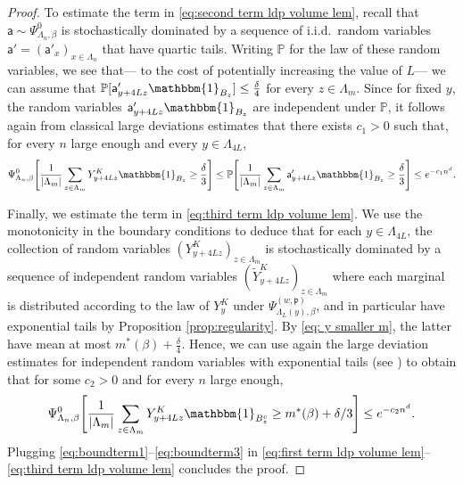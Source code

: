 \documentclass[11pt,a4paper]{article}
\theoremstyle{definition}
\numberwithin{equation}{section}
\begin{document}
\begin{proof}
To estimate the term in \eqref{eq:second term ldp volume lem},
recall that $\mathsf{a}\sim \Psi^0_{\Lambda_n,\beta}$ is stochastically dominated by a sequence of i.i.d.\ random variables $\mathsf{a}'=(\mathsf{a}'_x)_{x\in \Lambda_n}$ that have quartic tails. Writing $\mathbb{P}$ for the law of these random variables, we see that--- to the cost of potentially increasing the value of $L$--- we can assume that
$\mathbb{P}[\mathsf{a}'_{y+4Lz}\mathbbm{1}_{B_{z}}]\leq \tfrac{\delta}{4}$ for every $z\in \Lambda_m$. Since for fixed $y$, the random variables $\mathsf{a}'_{y+4Lz} \mathbbm{1}_{B_{z}}$ are independent under $\mathbb{P}$, it follows again from classical large deviations estimates that there exists $c_1>0$ such that, for every $n$ large enough and every $y\in \Lambda_{4L}$,
\begin{equation}\label{eq:boundterm2}
\Psi^0_{\Lambda_n,\beta}\Bigg[ \frac{1}{|\Lambda_m|} \sum_{
z\in \Lambda_m}Y_{y+4Lz}^K \mathbbm{1}_{B_z}\geq \frac{\delta}{3}\Bigg]\leq \mathbb{P}\Bigg[\frac{1}{|\Lambda_m|}\sum_{z\in \Lambda_m} \mathsf{a}'_{y+4Lz}\mathbbm{1}_{B_z}\geq \frac{\delta}{3}\Bigg]\leq e^{-c_1n^d}.
\end{equation}

Finally, we estimate the term in \eqref{eq:third term ldp volume lem}. We use the monotonicity in the boundary conditions to deduce that for each $y\in \Lambda_{4L}$,  the collection of random variables $(Y_{y+4Lz}^K)_{z\in \Lambda_m}$ is stochastically dominated by a sequence of independent random variables $(\tilde{Y}^K_{y+4Lz})_{z\in \Lambda_m}$ where each marginal is distributed according to the law of $Y_{y}^K$ under $\Psi^{(w,\mathfrak{p})}_{\Lambda_L(y),\beta}$, and in particular have exponential tails by Proposition \ref{prop:regularity}. By \eqref{eq: y smaller m}, the latter have mean at most $m^*(\beta)+\tfrac{\delta}{4}$. Hence, we can use again the large deviation estimates for independent random variables with exponential tails (see \cite{durrett2019probability}) to obtain that for some $c_2>0$ and for every $n$ large enough,
\begin{equation}\label{eq:boundterm3}
\Psi^0_{\Lambda_n,\beta}\Bigg[ \frac{1}{|\Lambda_m|} \sum_{
z\in \Lambda_m}Y_{y+4Lz}^K \mathbbm{1}_{B_z^c}\geq m^*(\beta)  + \delta/3\Bigg]\leq e^{-c_2n^d}.    
\end{equation}
Plugging \eqref{eq:boundterm1}--\eqref{eq:boundterm3} in \eqref{eq:first term ldp volume lem}--\eqref{eq:third term ldp volume lem} concludes the proof.
\end{proof}
\end{document}
